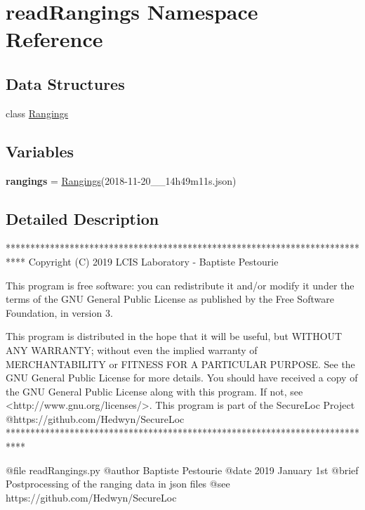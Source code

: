 \hypertarget{namespaceread_rangings}{}\section{read\+Rangings Namespace Reference}
\label{namespaceread_rangings}
\subsection*{Data Structures}
\begin{DoxyCompactItemize}
\item 
class \mbox{\hyperlink{classread_rangings_1_1_rangings}{Rangings}}
\end{DoxyCompactItemize}
\subsection*{Variables}
\begin{DoxyCompactItemize}
\item 
\mbox{\label{namespaceread_rangings_a9c7897b1ed7b191c2bb2b3cbcf8c07ff}} 
{\bfseries rangings} = \mbox{\hyperlink{classread_rangings_1_1_rangings}{Rangings}}(\textquotesingle{}2018-\/11-\/20\+\_\+\+\_\+14h49m11s.\+json\textquotesingle{})
\end{DoxyCompactItemize}


\subsection{Detailed Description}
\begin{DoxyVerb}****************************************************************************
Copyright (C) 2019 LCIS Laboratory - Baptiste Pestourie

This program is free software: you can redistribute it and/or modify
it under the terms of the GNU General Public License as published by
the Free Software Foundation, in version 3.

This program is distributed in the hope that it will be useful,
but WITHOUT ANY WARRANTY; without even the implied warranty of
MERCHANTABILITY or FITNESS FOR A PARTICULAR PURPOSE. See the
GNU General Public License for more details.
You should have received a copy of the GNU General Public License
along with this program. If not, see <http://www.gnu.org/licenses/>.
This program is part of the SecureLoc Project @https://github.com/Hedwyn/SecureLoc
 ****************************************************************************

@file readRangings.py
@author Baptiste Pestourie
@date 2019 January 1st
@brief Postprocessing of the ranging data in json files
@see https://github.com/Hedwyn/SecureLoc
\end{DoxyVerb}
 
